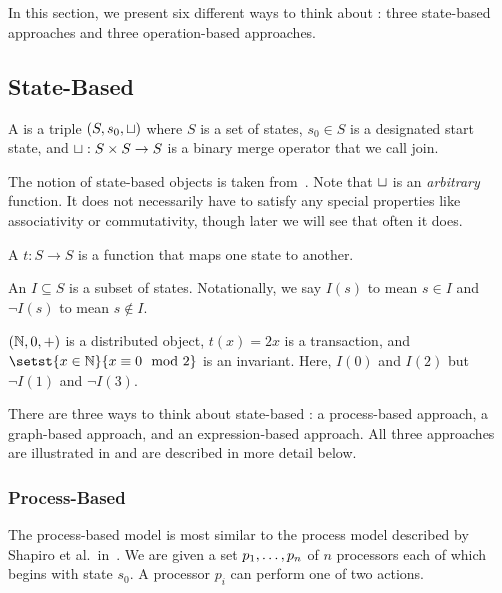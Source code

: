 \section{\Iconfluence{}}
In this section, we present six different ways to think about \Iconfluence{}:
three state-based approaches and three operation-based approaches.

\subsection{State-Based}
\begin{definition}
  A  is a triple $(S, s_0, \sqcup)$
  where $S$ is a set of states, $s_0 \in S$ is a designated start state, and
  $\sqcup: S \times S \to S$ is a binary merge operator that we call join.
\end{definition}

The notion of state-based objects is taken from~\cite{shapiro2011conflict}.
Note that $\sqcup$ is an \emph{arbitrary} function. It does not necessarily have
to satisfy any special properties like associativity or commutativity, though
later we will see that often it does.

\begin{definition}
  A  $t: S \to S$ is a function that maps one
  state to another.
\end{definition}

\begin{definition}
  An  $I \subseteq S$ is a subset of states. Notationally,
  we say $I(s)$ to mean $s \in I$ and $\lnot I(s)$ to mean $s \notin I$.
\end{definition}

\begin{example}
  $(\mathbb{N}, 0, +)$ is a distributed object, $t(x) = 2x$ is a transaction, and
  $\setst{x \in \nats}{x \equiv 0 \mod 2}$ is an invariant. Here, $I(0)$ and
  $I(2)$ but $\lnot I(1)$ and $\lnot I(3)$.
\end{example}

There are three ways to think about state-based \Iconfluence{}: a process-based
approach, a graph-based approach, and an expression-based approach. All three
approaches are illustrated in  and are described in
more detail below.



\subsubsection{Process-Based}
The process-based model is most similar to the process model described by
Shapiro et al.\ in~\cite{shapiro2011conflict}. We are given a set
${p}_{1}, \ldots, {p}_{n}$ of $n$ processors each of which begins with state $s_0$.  A
processor $p_i$ can perform one of two actions.

